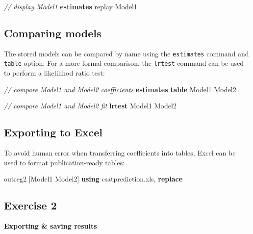 \documentclass[
]{book}
\newenvironment{Shaded}{\begin{snugshade}}{\end{snugshade}}
\newcommand{\CommentTok}[1]{\textcolor[rgb]{0.56,0.35,0.01}{\textit{#1}}}
\newcommand{\FunctionTok}[1]{\textcolor[rgb]{0.00,0.00,0.00}{#1}}
\newcommand{\KeywordTok}[1]{\textcolor[rgb]{0.13,0.29,0.53}{\textbf{#1}}}
\newcommand{\NormalTok}[1]{#1}
\begin{document}
\begin{Shaded}
\begin{Highlighting}[]
\CommentTok{// display Model1}
\KeywordTok{estimates} \FunctionTok{replay}\NormalTok{ Model1}
\end{Highlighting}
\end{Shaded}

\hypertarget{comparing-models-1}{%
\subsection{Comparing models}\label{comparing-models-1}}

The stored models can be compared by name using the \texttt{estimates} command and \texttt{table} option. For a more formal comparison, the \texttt{lrtest} command can be used to perform a likelihhod ratio test:

\begin{Shaded}
\begin{Highlighting}[]
\CommentTok{// compare Model1 and Model2 coefficients}
\KeywordTok{estimates} \KeywordTok{table}\NormalTok{ Model1 Model2}

\CommentTok{// compare Model1 and Model2 fit }
\KeywordTok{lrtest}\NormalTok{ Model1 Model2 }
\end{Highlighting}
\end{Shaded}

\hypertarget{exporting-to-excel}{%
\subsection{Exporting to Excel}\label{exporting-to-excel}}

To avoid human error when transferring coefficients into tables, Excel can be used to format publication-ready tables:

\begin{Shaded}
\begin{Highlighting}[]
\NormalTok{outreg2 [Model1 Model2] }\KeywordTok{using}\NormalTok{ csatprediction.xls, }\KeywordTok{replace}
\end{Highlighting}
\end{Shaded}

\hypertarget{exercise-2-6}{%
\subsection{Exercise 2}\label{exercise-2-6}}

\textbf{Exporting \& saving results}
\end{document}
